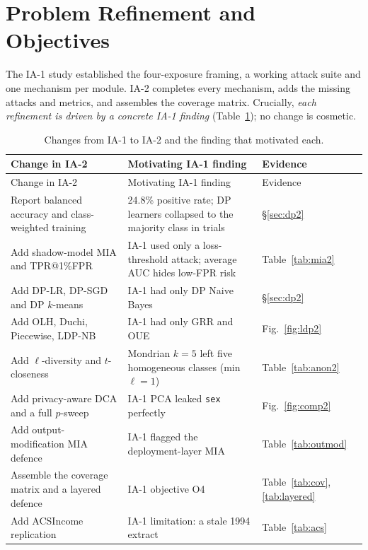 \documentclass[11pt,a4paper]{article}
\begin{document}
\section{Problem Refinement and Objectives}\label{sec:refine}
The IA-1 study established the four-exposure framing, a working attack suite and
one mechanism per module. IA-2 completes every mechanism, adds the missing
attacks and metrics, and assembles the coverage matrix. Crucially, \emph{each
refinement is driven by a concrete IA-1 finding} (Table~\ref{tab:changes}); no
change is cosmetic.

\begin{longtable}{p{5.2cm}p{5.0cm}p{3.6cm}}
\caption{Changes from IA-1 to IA-2 and the finding that motivated each.}\label{tab:changes}\\
\toprule
Change in IA-2 & Motivating IA-1 finding & Evidence\\
\midrule
\endfirsthead
\toprule Change in IA-2 & Motivating IA-1 finding & Evidence\\ \midrule
\endhead
Report balanced accuracy and class-weighted training & 24.8\% positive rate; DP learners collapsed to the majority class in trials & \S\ref{sec:dp2}\\
Add shadow-model MIA and TPR@1\%FPR & IA-1 used only a loss-threshold attack; average AUC hides low-FPR risk & Table~\ref{tab:mia2}\\
Add DP-LR, DP-SGD and DP $k$-means & IA-1 had only DP Naive Bayes & \S\ref{sec:dp2}\\
Add OLH, Duchi, Piecewise, LDP-NB & IA-1 had only GRR and OUE & Fig.~\ref{fig:ldp2}\\
Add $\ell$-diversity and $t$-closeness & Mondrian $k{=}5$ left five homogeneous classes (min $\ell{=}1$) & Table~\ref{tab:anon2}\\
Add privacy-aware DCA and a full $p$-sweep & IA-1 PCA leaked \texttt{sex} perfectly & Fig.~\ref{fig:comp2}\\
Add output-modification MIA defence & IA-1 flagged the deployment-layer MIA & Table~\ref{tab:outmod}\\
Assemble the coverage matrix and a layered defence & IA-1 objective O4 & Table~\ref{tab:cov}, \ref{tab:layered}\\
Add ACSIncome replication & IA-1 limitation: a stale 1994 extract & Table~\ref{tab:acs}\\
\bottomrule
\end{longtable}
\end{document}
